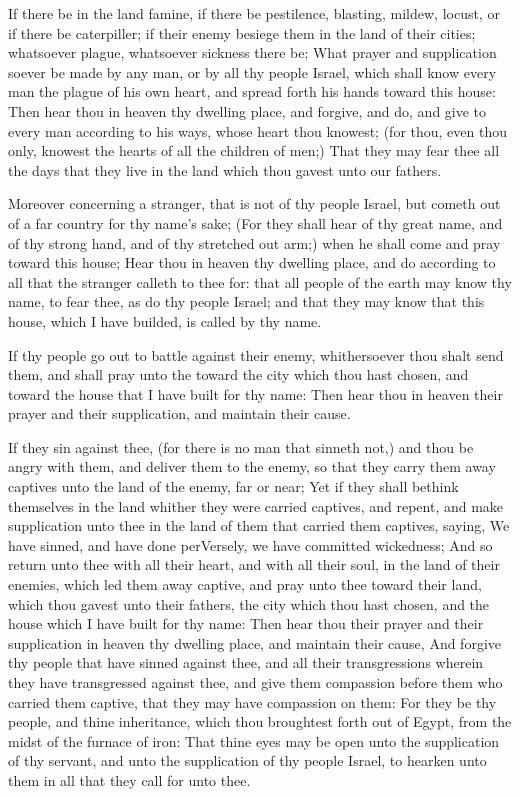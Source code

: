 \Verse If there be in the land famine, if there be pestilence, blasting, mildew, locust, or if there be caterpiller; if their enemy besiege them in the land of their cities; whatsoever plague, whatsoever sickness there be; \Verse What prayer and supplication soever be made by any man, or by all thy people Israel, which shall know every man the plague of his own heart, and spread forth his hands toward this house: \Verse Then hear thou in heaven thy dwelling place, and forgive, and do, and give to every man according to his ways, whose heart thou knowest; (for thou, even thou only, knowest the hearts of all the children of men;) \Verse That they may fear thee all the days that they live in the land which thou gavest unto our fathers.

\Verse Moreover concerning a stranger, that is not of thy people Israel, but cometh out of a far country for thy name's sake; \Verse (For they shall hear of thy great name, and of thy strong hand, and of thy stretched out arm;) when he shall come and pray toward this house; \Verse Hear thou in heaven thy dwelling place, and do according to all that the stranger calleth to thee for: that all people of the earth may know thy name, to fear thee, as do thy people Israel; and that they may know that this house, which I have builded, is called by thy name.

\Verse If thy people go out to battle against their enemy, whithersoever thou shalt send them, and shall pray unto the \LORD toward the city which thou hast chosen, and toward the house that I have built for thy name: \Verse Then hear thou in heaven their prayer and their supplication, and maintain their cause.

\Verse If they sin against thee, (for there is no man that sinneth not,) and thou be angry with them, and deliver them to the enemy, so that they carry them away captives unto the land of the enemy, far or near; \Verse Yet if they shall bethink themselves in the land whither they were carried captives, and repent, and make supplication unto thee in the land of them that carried them captives, saying, We have sinned, and have done perVersely, we have committed wickedness; \Verse And so return unto thee with all their heart, and with all their soul, in the land of their enemies, which led them away captive, and pray unto thee toward their land, which thou gavest unto their fathers, the city which thou hast chosen, and the house which I have built for thy name: \Verse Then hear thou their prayer and their supplication in heaven thy dwelling place, and maintain their cause, \Verse And forgive thy people that have sinned against thee, and all their transgressions wherein they have transgressed against thee, and give them compassion before them who carried them captive, that they may have compassion on them: \Verse For they be thy people, and thine inheritance, which thou broughtest forth out of Egypt, from the midst of the furnace of iron: \Verse That thine eyes may be open unto the supplication of thy servant, and unto the supplication of thy people Israel, to hearken unto them in all that they call for unto thee.

